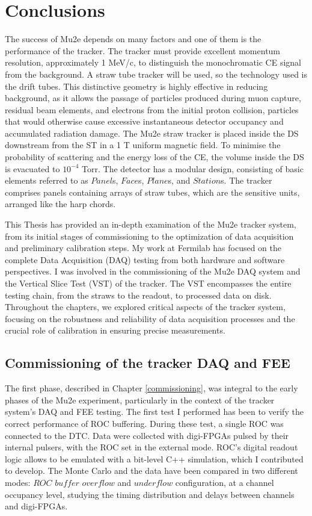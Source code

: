 \chapter{Conclusions}\label{conclusions}
The success of Mu2e depends on many factors and one of them is the 
performance of the tracker. 
The tracker must provide excellent momentum resolution, approximately 1 MeV/c, 
to distinguish the monochromatic CE signal from the background. 
A straw tube tracker will be used, so the 
technology used is the drift tubes. This distinctive geometry 
is highly effective in reducing background, as it allows 
the passage of particles produced during muon capture, 
residual beam elements, and electrons from the initial proton collision, 
particles that would otherwise cause excessive instantaneous detector 
occupancy and accumulated radiation damage. The Mu2e straw tracker is placed inside the DS downstream from 
the ST in a 1 T uniform magnetic field. To minimise the probability of scattering and the energy loss of the CE, 
the volume inside the DS is evacuated to $10^{-4}$ Torr. The detector has a modular design, consisting 
of basic elements referred to as $Panel$s, $Face$s, $Plane$s, and $Station$s. The 
tracker comprises panels containing arrays of straw tubes, which are the 
sensitive units, arranged like the harp chords.

This Thesis has provided an in-depth examination of the Mu2e 
tracker system, from its initial stages of commissioning to the 
optimization of data acquisition and preliminary calibration steps. 
My work at Fermilab has focused on the 
complete Data Acquisition (DAQ) testing from both hardware and software 
perspectives. I was involved in the commissioning of the Mu2e DAQ system and 
the Vertical Slice Test (VST) of the tracker. The VST encompasses the entire 
testing chain, from the straws to the readout, to processed data on disk.
Throughout the chapters, we explored critical aspects of the tracker 
system, focusing on the robustness and reliability of data acquisition 
processes and the crucial role of calibration in ensuring precise measurements. 

\section{Commissioning of the tracker DAQ and FEE}
The first phase, described in Chapter \ref{commissioning}, 
was integral to the early phases of the Mu2e experiment, particularly in the context of the 
tracker system's DAQ and FEE testing. 
The first test I performed has been to verify the correct performance of ROC 
buffering. During these test, a single ROC was connected to the DTC. Data were collected
with digi-FPGAs pulsed by their internal pulsers, with the ROC set in the external
mode. ROC's digital readout logic allows to be emulated with a bit-level C++ simulation,
which I contributed to develop. The Monte Carlo and the data have been compared in two different 
modes: $ROC$ $buffer$ $overflow$ and $underflow$ configuration, at a channel occupancy level, studying 
the timing distribution and delays between channels and digi-FPGAs.

